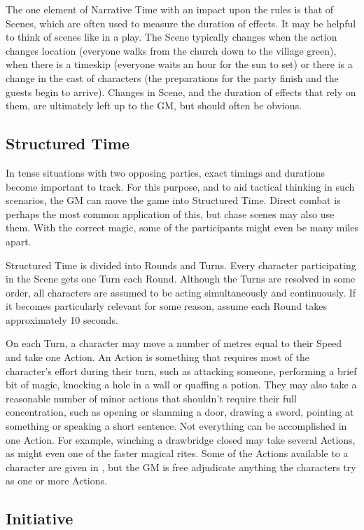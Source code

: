 The one element of Narrative Time with an impact upon the rules is that of Scenes, which are often used to measure the duration of effects.
It may be helpful to think of scenes like in a play.
The Scene typically changes when the action changes location (everyone walks from the church down to the village green), when there is a timeskip (everyone waits an hour for the sun to set) or there is a change in the cast of characters (the preparations for the party finish and the guests begin to arrive).
Changes in Scene, and the duration of effects that rely on them, are ultimately left up to the GM, but should often be obvious.

\subsection{Structured Time}

In tense situations with two opposing parties, exact timings and durations become important to track.
For this purpose, and to aid tactical thinking in such scenarios, the GM can move the game into Structured Time.
Direct combat is perhaps the most common application of this, but chase scenes may also use them.
With the correct magic, some of the participants might even be many miles apart.

Structured Time is divided into Rounds and Turns.
Every character participating in the Scene gets one Turn each Round.
Although the Turns are resolved in some order, all characters are assumed to be acting simultaneously and continuously.
If it becomes particularly relevant for some reason, assume each Round takes approximately 10 seconds.

On each Turn, a character may move a number of metres equal to their Speed and take one Action.
An Action is something that requires most of the character's effort during their turn, such as attacking someone, performing a brief bit of magic, knocking a hole in a wall or quaffing a potion.
They may also take a reasonable number of minor actions that shouldn't require their full concentration, such as opening or slamming a door, drawing a sword, pointing at something or speaking a short sentence.
Not everything can be accomplished in one Action.
For example, winching a drawbridge closed may take several Actions, as might even one of the faster magical rites.
Some of the Actions available to a character are given in , but the GM is free adjudicate anything the characters try as one or more Actions.

\subsection{Initiative}

